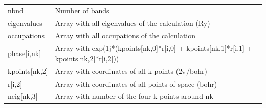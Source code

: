\documentclass[a4paper,12pt]{report}
\begin{document}
\hspace*{-2cm}\begin{tabularx}{\textwidth}{ll}
 nbnd           & Number of bands \\

 eigenvalues    & Array with all eigenvalues of the calculation (Ry) \\
 occupations    & Array with all occupations of the calculation \\

 phase[i,nk]    & Array with exp(1j*(kpoints[nk,0]*r[i,0] + kpoints[nk,1]*r[i,1] + kpoints[nk,2]*r[i,2])) \\
 kpoints[nk,2]  & Array with coordinates of all k-points ($2\pi$/bohr) \\
 r[i,2]         & Array with coordinates of all points of space (bohr) \\

 neig[nk,3]     & Array with number of the four k-points around nk \\
\end{tabularx}
\end{document}

